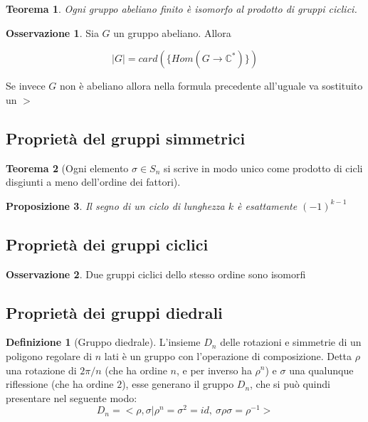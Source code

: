 \documentclass[11pt]{article}
\theoremstyle{plain}
\newtheorem{thm}{Teorema}[section]
\newtheorem{prop}[thm]{Proposizione}
\theoremstyle{definition}
\newtheorem{defn}{Definizione}[section]
\newtheorem*{rem}{Osservazione}
\theoremstyle{remark}
\newcommand{\C}{\mathbb{C}}
\begin{document}
\begin{thm}Ogni gruppo abeliano finito è isomorfo al prodotto di gruppi ciclici.


\end{thm}

\begin{rem} Sia $G$ un gruppo abeliano. Allora 

\[ |G| = card(\{Hom(G \to \C^*) \})\]


Se invece $G$ non è abeliano allora nella formula precedente all'uguale va sostituito un $>$

\end{rem}


\subsection{Proprietà del gruppi simmetrici}

\begin{thm}[Ogni elemento $\sigma \in S_n$ si scrive in modo unico come prodotto di cicli disgiunti a meno dell'ordine dei fattori]


\end{thm}

\begin{prop}Il segno di un ciclo di lunghezza $k$ è esattamente $(-1)^{k-1}$


\end{prop}



\subsection{Proprietà dei gruppi ciclici}

\begin{rem}
Due gruppi ciclici dello stesso ordine sono isomorfi
\end{rem}

\subsection{Proprietà dei gruppi diedrali}

\begin{defn}[Gruppo diedrale]
L'insieme $D_n$ delle rotazioni e simmetrie di un poligono regolare di $n$ lati è un gruppo con l'operazione di composizione.
Detta $\rho$ una rotazione di $2\pi/n$ (che ha ordine $n$, e per inverso ha $\rho^{n}$) e $\sigma$ una qualunque riflessione (che ha ordine $2$), esse generano
il gruppo $D_n$, che si può quindi presentare nel seguente modo: $$D_n=<\rho,\sigma|\rho^n=\sigma^2=id,\ \sigma\rho\sigma=\rho^{-1}>$$
\end{defn}
\end{document}
